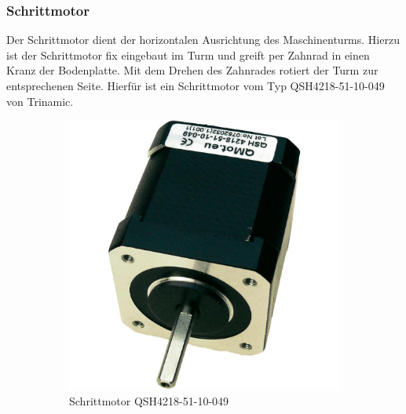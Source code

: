 \subsubsection{Schrittmotor}
Der Schrittmotor dient der horizontalen Ausrichtung des Maschinenturms.
Hierzu ist der Schrittmotor fix eingebaut im Turm und greift per Zahnrad
in einen Kranz der Bodenplatte. Mit dem Drehen des Zahnrades rotiert der
Turm zur entsprechenen Seite. Hierfür ist ein Schrittmotor vom Typ 
QSH4218-51-10-049 von Trinamic.

\begin{figure}[h!]
	\centering
	\begin{subfigure}[b]{0.45\textwidth}
		\centering
		\includegraphics[width=1\textwidth]{../../fig/et/QSH4218-51-10-049.jpg}
		\caption{Schrittmotor QSH4218-51-10-049}
	\end{subfigure}
	\begin{subfigure}[b]{0.45\textwidth}
		\centering

\end{subfigure}
\end{figure}

